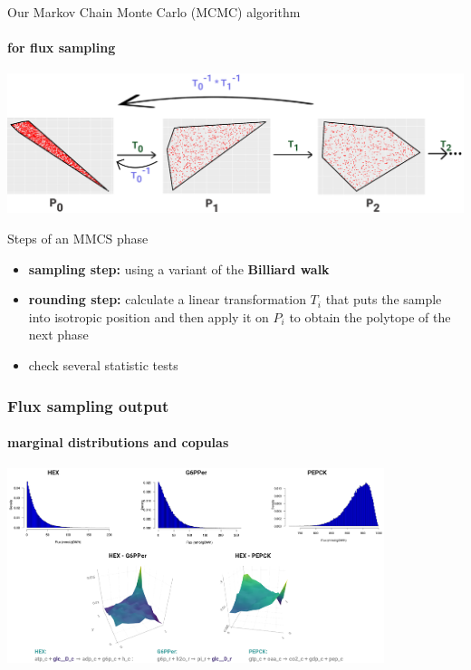 \documentclass{beamer}
\begin{document}
   \begin{frame}{Our Markov Chain Monte Carlo (MCMC) algorithm}
      \framesubtitle{for flux sampling}

      \includegraphics[scale=0.11]{ ../met_nets/resources/sampling_extra_phase_croped_transparent.png}
      
      \scriptsize
      \begin{block}{Steps of an MMCS phase}
         \begin{itemize}
            \item \textbf{sampling step:} using a variant of the \textbf{Billiard walk}  
            \item \textbf{rounding step:} calculate a linear transformation $T_i$ that puts the sample into isotropic position and then apply it on $P_i$ to obtain the polytope of the next phase
            \item check several statistic tests
         \end{itemize}      

      \end{block}

   

   \end{frame}


   \begin{frame}
      \frametitle{Flux sampling output}
      \framesubtitle{marginal distributions and copulas}
      \includegraphics[width=110mm]{resources/copulas_cropped_transp.png}
   
   \end{frame}
\end{document}
